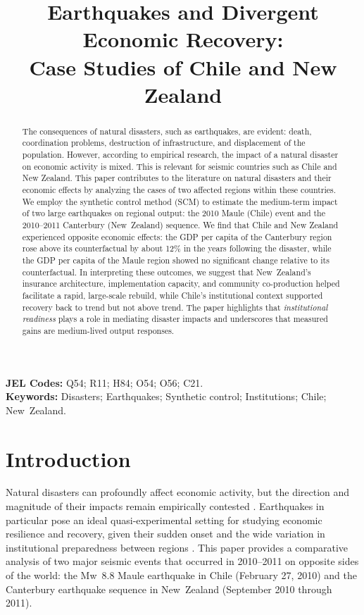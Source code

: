 \documentclass[12pt]{article}
\title{\Large\textbf{Earthquakes and Divergent Economic Recovery:\\
Case Studies of Chile and New Zealand}}
\author{}
\begin{document}
\maketitle

\begin{abstract}
\singlespacing
The consequences of natural disasters, such as earthquakes, are evident: death, coordination problems, destruction of infrastructure, and displacement of the population. However, according to empirical research, the impact of a natural disaster on economic activity is mixed. This is relevant for seismic countries such as Chile and New Zealand. This paper contributes to the literature on natural disasters and their economic effects by analyzing the cases of two affected regions within these countries. We employ the synthetic control method (SCM) to estimate the medium-term impact of two large earthquakes on regional output: the 2010 Maule (Chile) event and the 2010--2011 Canterbury (New~Zealand) sequence. We find that Chile and New Zealand experienced opposite economic effects: the GDP per capita of the Canterbury region rose above its counterfactual by about 12\% in the years following the disaster, while the GDP per capita of the Maule region showed no significant change relative to its counterfactual. In interpreting these outcomes, we suggest that New~Zealand’s insurance architecture, implementation capacity, and community co-production helped facilitate a rapid, large-scale rebuild, while Chile’s institutional context supported recovery back to trend but not above trend. The paper highlights that \textit{institutional readiness} plays a role in mediating disaster impacts and underscores that measured gains are medium-lived output responses.
\end{abstract}



\noindent\textbf{JEL Codes:} Q54; R11; H84; O54; O56; C21.\\
\noindent\textbf{Keywords:} Disasters; Earthquakes; Synthetic control; Institutions; Chile; New Zealand.\\

\newpage
\section{Introduction}
Natural disasters can profoundly affect economic activity, but the direction and magnitude of their impacts remain empirically contested \parencite{noy2009macroeconomic, barone2014natural, boustan2020effect, coffman2012hurricane}. Earthquakes in particular pose an ideal quasi-experimental setting for studying economic resilience and recovery, given their sudden onset and the wide variation in institutional preparedness between regions \parencite{barone2014natural, boustan2020effect, kahn2005death}. This paper provides a comparative analysis of two major seismic events that occurred in 2010--2011 on opposite sides of the world: the Mw 8.8 Maule earthquake in Chile (February 27, 2010) and the Canterbury earthquake sequence in New Zealand (September 2010 through 2011).
\end{document}
